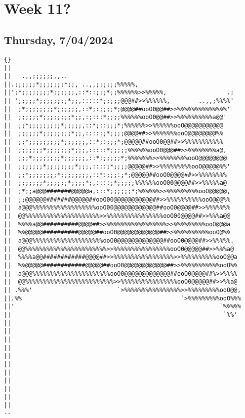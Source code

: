 \newpage
\section{Week 11?}

\subsection*{Thursday, 7/04/2024}
\begin{verbatim}
{} 
|| 
||   .,,;;;;;;,,.. 
||.;;;;;;*;;;;;;;*;;, ..,,;;;;;;%%%%%, 
||';*;;;;;;;;*;;;;;;,::*::;;;*;;%%%%%%>>%%%%%,                 .; 
|| ';;;;;*;;;;;;;;*;;,:::::*;;;;;@@@##>>%%%%%%,        ..,,;%%%%' 
||  ;*;;;;;;;;*;;;;;;,::*;:;;;;*;@@@@##ooO0@@##>>%%%%%%%%%%%%%%' 
||  ;;;;;;*;;;;;;;;*;;,:;:::*;;;;%%%%%%ooO0@@##>>%%%%%%%%%%a@@' 
||  ;;*;;;;;;;;;*;;;;;,::*;::;;;*;%%%%%%>>%%%%%%ooO@@@@@@@@@@@ 
||  ;;;;;;*;;;;;;;;*;;,:::::;*;;;;@@@@##>>%%%%%%%ooO@@@@@@@@%% 
||  ;;*;;;;;;;;;*;;;;;;,::*;:;;;*;@@@@@##ooO0@@##>>%%%%%%%%%%% 
||  ;;;;;;;*;;;;;;;*;;;,:::::*;;;;;%%%%%%ooO0@@@##>>%%%%%%%%a@, 
||  ;;;*;;;;;;;;*;;;;;;,::*:;;;;;*;%%%%%%%>>%%%%%%%%ooO@@@@@@@@ 
||  ;;;;;;;*;;;;;;;;*;;;,::::;*;;;;@@@@@##>>%%%%%%%%%ooO@@@@@%%' 
||  ;;*;;;;;;;;*;;;;;;;;,::*:;;;:;*;@@@@@##ooO0@@@@##>>%%%%%%%% 
||  ;;;;;;;*;;;;;;*;;;;*;,::::;*;;;;;%%%%%%ooO00@@@@##>>%%%%%a@ 
||  ;*;;a@@@#######@@@@@a,:::*;;;;;;*;%%%%%%>>%%%%%%%%%ooO@@@@@, 
||  ;;@@@@@@#######@@@@@##ooO00@@@@@@@@@@@##>>%%%%%%%%%%ooO@@@%% 
||  a@@@%%%%%%%%%%%%%%%%%%ooO00@@@@@@@@@@@@##ooO0@@@@##>>%%%%%%% 
||  @@%%%%%%%%%%%%%%%%%%%%%>>%%%%%%%%%%%%%%%%ooO00@@@@##>>%%%a@@ 
||  %%%%a@@##########@@@@##>>%%%%%%%%%%%%%%%%%>>%%%%%%%%%ooO@@@a 
||  %%@@@@@##########@@@@@##ooO0@@@@@@@@@@@@##>>%%%%%%%%%%ooO@%% 
||  a@@@%%%%%%%%%%%%%%%%%%%%ooO0@@@@@@@@@@@@@##ooO0@@@@##>>%%%%%. 
||  @@%%%%%%%%%%%%%%%%%%%%%%%>>%%%%%%%%%%%%%%%%ooO0@@@@@##>>%%%a@ 
||  %%%%a@@############@@@@##>>%%%%%%%%%%%%%%%%%>>%%%%%%%%%%ooO@@a 
||  %%@@@@@############@@@@@##ooO0@@@@@@@@@@@@##>>%%%%%%%%%%%ooO%% 
||  a@@@%%%%%%%%%%%%%%%%%%%%%%ooO0@@@@@@@@@@@@@##ooO0@@@@##%>>%%%% 
||  @@%%%%%%%%%%%%%%%%%%%%%%%%%>>%%%%%%%%%%%%%%%%ooO0@@@@@##>>%%a@ 
|| .%%%'                        `>%%%%%%%%%%%%%%%%>>%%%%%%%%%ooO@@, 
||.%%                                             `>%%%%%%%%%ooO%%% 
||'                                                          `%%%%% 
||                                                            `%%' 
|| 
|| 
|| 
|| 
|| 
|| 
|| 
|| 
|| 
|| 
|| 
--
\end{verbatim}
